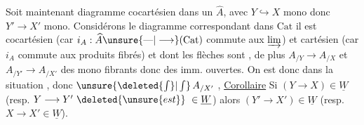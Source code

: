 
Soit maintenant
diagramme cocartésien dans un $\widehat A$, avec $Y\hookrightarrow X$ mono donc
$Y'\longrightarrow X'$ mono. 
Considérons le diagramme  correspondant dans $\mathrm{Cat}$
il est cocartésien (car $i_A:\widehat A\unsure{\mathbin{\text{---}}|\longrightarrow}(\mathrm{Cat})$ commute aux
$\varinjlim$) et cartésien (car $i_A$ commute aux produits fibrés) et dont les flèches
sont , de plus $A_{/Y}\longrightarrow A_{/X}$ et
$A_{/Y'}\longrightarrow A_{/X'}$  des mono fibrants donc des imm. ouvertes.
On est donc dans la situation , donc
$\unsure{\deleted{\int}|\int}\,A_{/X'}$ 
,
\uline{Corollaire} Si $(Y\longrightarrow X)\in\underline W$
(resp. $Y\longrightarrow Y'\ \deleted{\unsure{est}}\ \in\underline W$)
alors $(Y'\longrightarrow X')\in\underline W$
(resp. $X\longrightarrow X'\in\underline W$).
